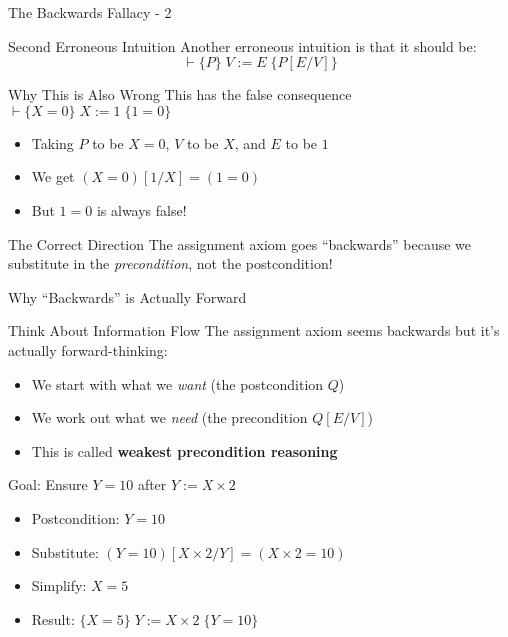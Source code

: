 \begin{frame}{The Backwards Fallacy - 2}
    \begin{block}{Second Erroneous Intuition}
        Another erroneous intuition is that it should be:
        \[ \vdash \{P\} \; V := E \; \{P[E/V]\} \]
    \end{block}
    
    \begin{alertblock}{Why This is Also Wrong}
        This has the false consequence $\vdash \{X = 0\} \; X := 1 \; \{1 = 0\}$
        \begin{itemize}
            \item Taking $P$ to be $X = 0$, $V$ to be $X$, and $E$ to be $1$
            \item We get $(X = 0)[1/X] = (1 = 0)$
            \item But $1 = 0$ is always false!
        \end{itemize}
    \end{alertblock}
    
    \begin{block}{The Correct Direction}
        The assignment axiom goes ``backwards'' because we substitute in the \emph{precondition}, not the postcondition!
    \end{block}
\end{frame}

\begin{frame}{Why ``Backwards'' is Actually Forward}
    \begin{block}{Think About Information Flow}
        The assignment axiom seems backwards but it's actually forward-thinking:
        \begin{itemize}
            \item We start with what we \emph{want} (the postcondition $Q$)
            \item We work out what we \emph{need} (the precondition $Q[E/V]$)
            \item This is called \textbf{weakest precondition reasoning}
        \end{itemize}
    \end{block}
    
    \begin{example}
        Goal: Ensure $Y = 10$ after $Y := X \times 2$
        \begin{itemize}
            \item Postcondition: $Y = 10$
            \item Substitute: $(Y = 10)[X \times 2/Y] = (X \times 2 = 10)$
            \item Simplify: $X = 5$
            \item Result: $\{X = 5\} \; Y := X \times 2 \; \{Y = 10\}$
        \end{itemize}
    \end{example}
\end{frame}
